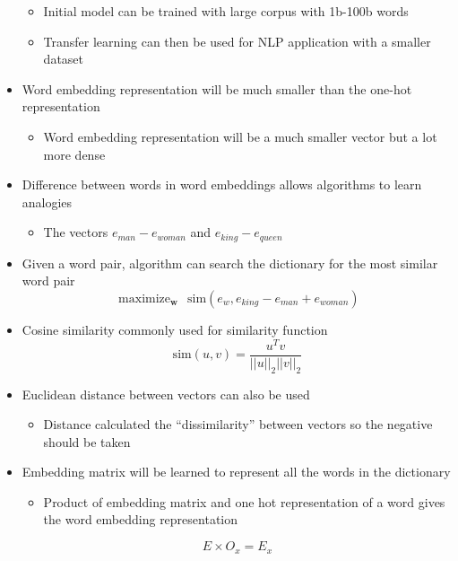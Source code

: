\documentclass[12pt, letterpaper]{article}
\begin{document}
\begin{itemize}
        \begin{itemize}
            \item Initial model can be trained with large corpus with 1b-100b words
            \item Transfer learning can then be used for NLP application with a smaller dataset
        \end{itemize}
        \item Word embedding representation will be much smaller than the one-hot representation
        \begin{itemize}
            \item Word embedding representation will be a much smaller vector but a lot more dense 
        \end{itemize}
        \item Difference between words in word embeddings allows algorithms to learn analogies
        \begin{itemize}
            \item The vectors $e_{man}-e_{woman}$ and $e_{king}-e_{queen}$
        \end{itemize}
        \item Given a word pair, algorithm can search the dictionary for the most similar word pair
        $$\mathop{\text{maximize}}_{\textbf{w}}~~\text{sim}(e_w,e_{king}-e_{man}+e_{woman})$$
        \item Cosine similarity commonly used for similarity function
        $$\text{sim}(u,v)=\frac{u^Tv}{||u||_2||v||_2}$$
        \item Euclidean distance between vectors can also be used
        \begin{itemize}
            \item Distance calculated the ``dissimilarity'' between vectors so the negative should be taken
        \end{itemize}
        \item Embedding matrix will be learned to represent all the words in the dictionary
        \begin{itemize}
            \item Product of embedding matrix and one hot representation of a word gives the word embedding representation
        \end{itemize}
        $$E\times O_x=E_x$$
    \end{itemize}
\end{document}

